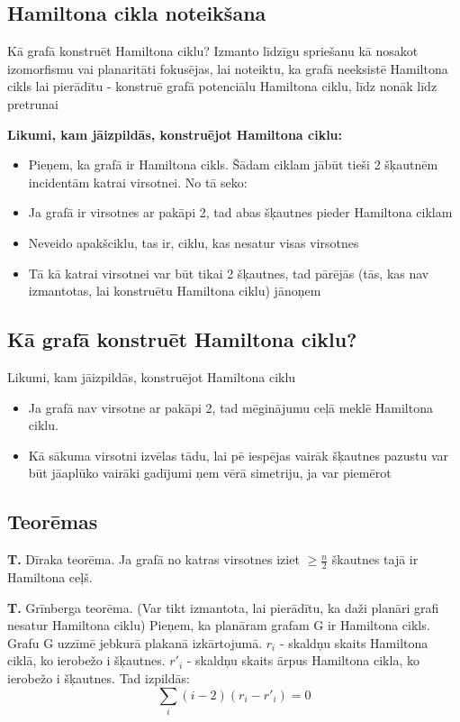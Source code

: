 \documentclass{article}
\begin{document}
\subsection{Hamiltona cikla noteikšana}
Kā grafā konstruēt Hamiltona ciklu? Izmanto līdzīgu spriešanu kā nosakot izomorfismu vai planaritāti fokusējas, lai noteiktu, ka grafā neeksistē Hamiltona cikls lai pierādītu - konstruē grafā potenciālu Hamiltona ciklu, līdz nonāk līdz pretrunai

\textbf{Likumi, kam jāizpildās, konstruējot Hamiltona ciklu:}
\begin{itemize}
	\item Pieņem, ka grafā ir Hamiltona cikls. Šādam ciklam jābūt tieši 2 šķautnēm incidentām katrai virsotnei. No tā seko:
	\item Ja grafā ir virsotnes ar pakāpi 2, tad abas šķautnes pieder Hamiltona ciklam
	\item Neveido apakšciklu, tas ir, ciklu, kas nesatur visas virsotnes
	\item Tā kā katrai virsotnei var būt tikai 2 šķautnes, tad pārējās (tās, kas nav izmantotas, lai konstruētu Hamiltona ciklu) jānoņem
\end{itemize}
	
\subsection{Kā grafā konstruēt Hamiltona ciklu?}
Likumi, kam jāizpildās, konstruējot Hamiltona ciklu
\begin{itemize}
	\item Ja grafā nav virsotne ar pakāpi 2, tad mēginājumu ceļā meklē Hamiltona ciklu.
	\item Kā sākuma virsotni izvēlas tādu, lai pē iespējas vairāk šķautnes pazustu var būt jāaplūko vairāki gadījumi ņem vērā simetriju, ja var piemērot
\end{itemize}
	
\subsection{Teorēmas}

\textbf{T. }Dīraka teorēma. Ja grafā no katras virsotnes iziet $\ge \frac{n}{2}$ škautnes tajā ir Hamiltona ceļš.

\textbf{T. }Grīnberga teorēma.  (Var tikt izmantota, lai pierādītu, ka daži planāri grafi nesatur Hamiltona ciklu) Pieņem, ka planāram grafam G ir Hamiltona cikls. Grafu G uzzīmē jebkurā plakanā izkārtojumā.  $r_i$ - skaldņu skaits Hamiltona ciklā, ko ierobežo i šķautnes.  $r'_i$ - skaldņu skaits ārpus Hamiltona cikla, ko ierobežo i šķautnes. 
Tad izpildās:
\begin{equation}
	\sum_{i}{}(i − 2)(r_i − r'_i ) = 0
\end{equation}
\end{document}
